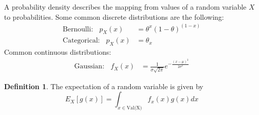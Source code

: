 \documentclass{article}
\theoremstyle{definition}
\newtheorem{definition}{Definition}[section]
\begin{document}
        A probability density describes the mapping from values of a random variable $X$ to probabilities. Some common 
        discrete distributions are the following:
        \begin{align}
            \text{Bernoulli:} \ \ \ \ p_X(x) &= \theta^x (1- \theta)^{(1-x)}\\
            \text{Categorical:} \ \ \ \ p_X(x) &= \theta_x
        \end{align}
        Common continuous distributions:
        \begin{align}
            \text{Gaussian:} \ \ \ \ f_X(x) &= \frac{1}{\sigma\sqrt{2\pi}}e^{-\frac{(x-\mu)^2}{2\sigma^2}}
        \end{align}
        \begin{mdframed}[]
            \begin{definition}
                The expectation of a random variable is given by 
                \[
                    E_X[g(x)] = \int_{x \in \text{Val(X)}}f_x(x)g(x)dx
                \]
            \end{definition}
        \end{mdframed}
        
\end{document}
